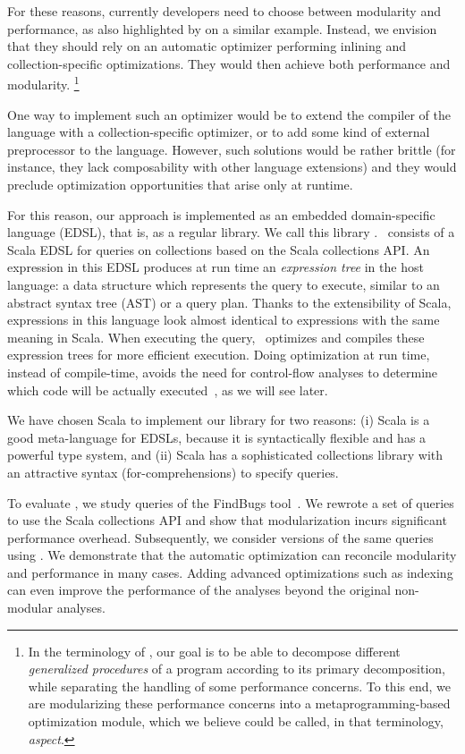 For these reasons, currently developers need to choose between modularity and
performance, as also highlighted by
\citet{AOP} on a similar example.
Instead, we envision that they should rely on an automatic optimizer performing inlining
and collection-specific optimizations. They would then achieve both performance and modularity.%
\footnote{In the terminology of \citet{AOP}, our goal is to be able to decompose
different \emph{generalized procedures} of a program according to its primary
decomposition, while separating the handling of some performance concerns. To
this end, we are modularizing these performance concerns into a
metaprogramming-based optimization module, which we believe
could be called, in that terminology, \emph{aspect}.}

One way to implement such an optimizer would be to extend the compiler of the language with a collection-specific optimizer, or
to add some kind of external preprocessor to the language. However, such solutions would be rather brittle (for instance, they lack
composability with other language extensions) and they would preclude optimization opportunities that arise only at runtime.

For this reason, our approach is implemented as an embedded domain-specific language (EDSL), that is, as a regular library.
We call this library \LoSDef. \LoS\ consists of a Scala EDSL for queries on collections based on the Scala collections API\@.
An expression in this EDSL produces at run time an \emph{expression tree} in the host language: a data structure which represents the query to execute, similar to an abstract syntax tree (AST) or a query plan. Thanks to the extensibility of Scala, expressions in this language look almost identical to expressions with the same meaning in Scala.
When executing the query, \LoS\ optimizes and compiles these expression trees for more efficient execution. Doing optimization at run time, instead of compile-time, avoids the need for control-flow analyses to determine which code will be actually executed~\citep{Chambers10}, as we will see later.

We have chosen Scala \citep{Odersky11book} to implement our library for two reasons: (i) Scala is a good meta-language for EDSLs, because it is syntactically
flexible and has a powerful type system, and (ii) Scala has a sophisticated collections library with an attractive syntax (for-comprehensions) to specify queries.

To evaluate \LoS, we study queries of the FindBugs tool~\citep{DBLP:journals/sigplan/HovemeyerP04}.
We rewrote a set of queries to use the Scala collections API and show that modularization incurs significant performance overhead. Subsequently, we consider versions of the same queries using \LoS{}.
We demonstrate that the automatic optimization can reconcile modularity and performance in many cases. Adding advanced optimizations such as indexing can even improve the performance of the analyses beyond the original non-modular analyses.

